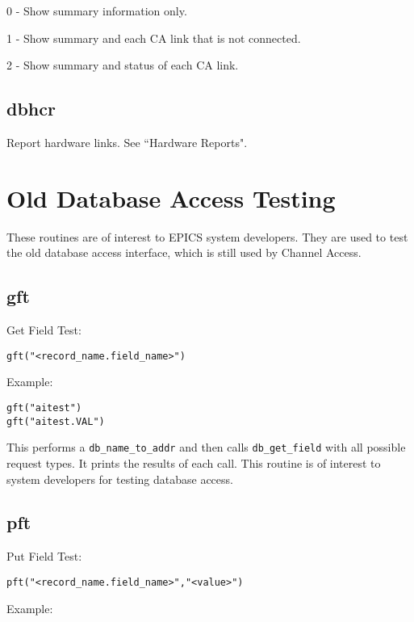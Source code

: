 \begin{description}\item 0 - Show summary information only.

\item 1 - Show summary and each CA link that is not connected.

\item 2 - Show summary and status of each CA link.

\end{description}\subsection{dbhcr}

Report hardware links. See ``Hardware Reports".

\section{Old Database Access Testing}

These routines are of interest to EPICS system developers. They are used to test the old database access interface, which 
is still used by Channel Access.

\subsection{gft}

Get Field Test:

\begin{verbatim}gft("<record_name.field_name>")
\end{verbatim}Example:

\begin{verbatim}gft("aitest")
gft("aitest.VAL")
\end{verbatim}This performs a \verb|db_name_to_addr| and then calls \verb|db_get_field| with all possible request types. It prints the results 
of each call. This routine is of interest to system developers for testing database access.

\subsection{pft}

Put Field Test:

\begin{verbatim}pft("<record_name.field_name>","<value>")
\end{verbatim}Example:

